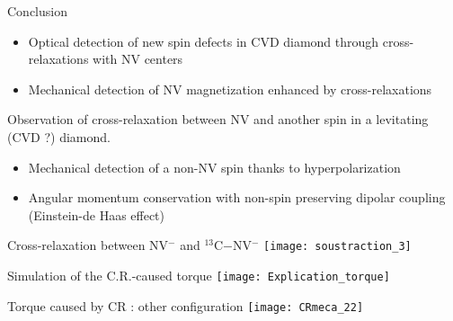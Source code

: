 \documentclass{beamer}
\begin{document}
\begin{frame}{Conclusion}
\begin{tcolorbox}[title=Summary,colbacktitle=red!80!white]
\begin{itemize}
\item{Optical detection of new spin defects in CVD diamond through cross-relaxations with NV centers}
\item{Mechanical detection of NV magnetization enhanced by cross-relaxations}
\end{itemize}
\end{tcolorbox}
\pause
\begin{tcolorbox}[title=Prospects,colbacktitle=blue!80!white]
Observation of cross-relaxation between NV and another spin in a levitating (CVD ?) diamond.
\begin{itemize}
\item Mechanical detection of a non-NV spin thanks to hyperpolarization
\item Angular momentum conservation with non-spin preserving dipolar coupling (Einstein-de Haas effect)
\end{itemize}
\end{tcolorbox}
\end{frame}
\begin{frame}{Cross-relaxation between NV$^-$ and $^{13}$C$-$NV$^-$}
\texttt{[image: soustraction\_3]}
\end{frame}
\begin{frame}{Simulation of the C.R.-caused torque}
\centering
\texttt{[image: Explication\_torque]}
\end{frame}
\begin{frame}{Torque caused by CR : other configuration}
\centering
\texttt{[image: CRmeca\_22]}
\end{frame}
\end{document}
